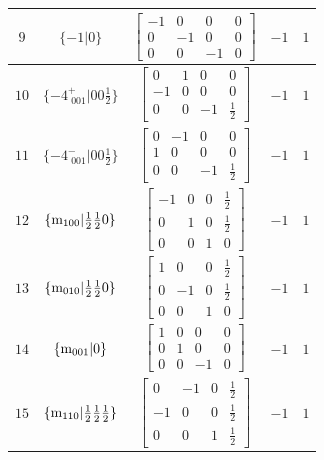 \documentclass[fleqn,8pt]{jsarticle}
\begin{document}
\begin{longtable}{ccccc}
$ 9 $ & $ \{-1|0\} $ & $ \begin{bmatrix} -1 & 0 & 0 & 0 \\ 0 & -1 & 0 & 0 \\ 0 & 0 & -1 & 0 \end{bmatrix} $ & $ -1 $ & $ 1 $ \\ \hline
$ 10 $ & $ \{-4^{+}_{\,\,001}|0 0 \frac{1}{2}\} $ & $ \begin{bmatrix} 0 & 1 & 0 & 0 \\ -1 & 0 & 0 & 0 \\ 0 & 0 & -1 & \frac{1}{2} \end{bmatrix} $ & $ -1 $ & $ 1 $ \\ \hline
$ 11 $ & $ \{-4^{-}_{\,\,001}|0 0 \frac{1}{2}\} $ & $ \begin{bmatrix} 0 & -1 & 0 & 0 \\ 1 & 0 & 0 & 0 \\ 0 & 0 & -1 & \frac{1}{2} \end{bmatrix} $ & $ -1 $ & $ 1 $ \\ \hline
$ 12 $ & $ \{{\rm m}_{100}|\frac{1}{2} \frac{1}{2} 0\} $ & $ \begin{bmatrix} -1 & 0 & 0 & \frac{1}{2} \\ 0 & 1 & 0 & \frac{1}{2} \\ 0 & 0 & 1 & 0 \end{bmatrix} $ & $ -1 $ & $ 1 $ \\ \hline
$ 13 $ & $ \{{\rm m}_{010}|\frac{1}{2} \frac{1}{2} 0\} $ & $ \begin{bmatrix} 1 & 0 & 0 & \frac{1}{2} \\ 0 & -1 & 0 & \frac{1}{2} \\ 0 & 0 & 1 & 0 \end{bmatrix} $ & $ -1 $ & $ 1 $ \\ \hline
$ 14 $ & $ \{{\rm m}_{001}|0\} $ & $ \begin{bmatrix} 1 & 0 & 0 & 0 \\ 0 & 1 & 0 & 0 \\ 0 & 0 & -1 & 0 \end{bmatrix} $ & $ -1 $ & $ 1 $ \\ \hline
$ 15 $ & $ \{{\rm m}_{110}|\frac{1}{2} \frac{1}{2} \frac{1}{2}\} $ & $ \begin{bmatrix} 0 & -1 & 0 & \frac{1}{2} \\ -1 & 0 & 0 & \frac{1}{2} \\ 0 & 0 & 1 & \frac{1}{2} \end{bmatrix} $ & $ -1 $ & $ 1 $ \\ \hline

\end{longtable}
\end{document}
